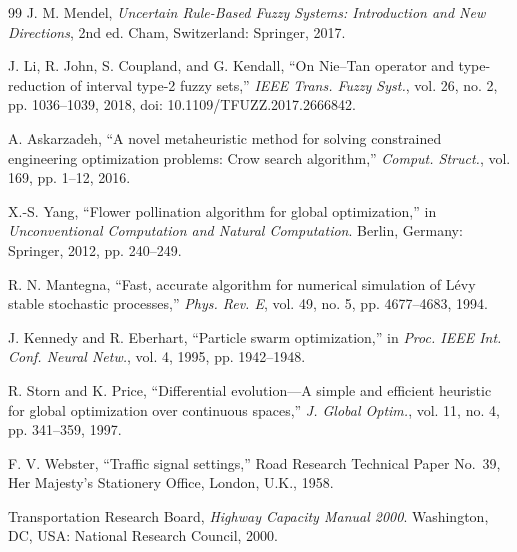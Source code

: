 \begin{thebibliography}{99}
 J. M. Mendel, \emph{Uncertain Rule-Based Fuzzy Systems: Introduction and New Directions}, 2nd ed. Cham, Switzerland: Springer, 2017.

 J. Li, R. John, S. Coupland, and G. Kendall, ``On Nie--Tan operator and type-reduction of interval type-2 fuzzy sets,'' \emph{IEEE Trans. Fuzzy Syst.}, vol. 26, no. 2, pp. 1036--1039, 2018, doi: 10.1109/TFUZZ.2017.2666842.

 A. Askarzadeh, ``A novel metaheuristic method for solving constrained engineering optimization problems: Crow search algorithm,'' \emph{Comput. Struct.}, vol. 169, pp. 1--12, 2016.

 X.-S. Yang, ``Flower pollination algorithm for global optimization,'' in \emph{Unconventional Computation and Natural Computation}. Berlin, Germany: Springer, 2012, pp. 240--249.

 R. N. Mantegna, ``Fast, accurate algorithm for numerical simulation of L{\'e}vy stable stochastic processes,'' \emph{Phys. Rev. E}, vol. 49, no. 5, pp. 4677--4683, 1994.

 J. Kennedy and R. Eberhart, ``Particle swarm optimization,'' in \emph{Proc. IEEE Int. Conf. Neural Netw.}, vol. 4, 1995, pp. 1942--1948.

 R. Storn and K. Price, ``Differential evolution---A simple and efficient heuristic for global optimization over continuous spaces,'' \emph{J. Global Optim.}, vol. 11, no. 4, pp. 341--359, 1997.

 F. V. Webster, ``Traffic signal settings,'' Road Research Technical Paper No.~39, Her Majesty's Stationery Office, London, U.K., 1958.

 Transportation Research Board, \emph{Highway Capacity Manual 2000}. Washington, DC, USA: National Research Council, 2000.

\end{thebibliography}
